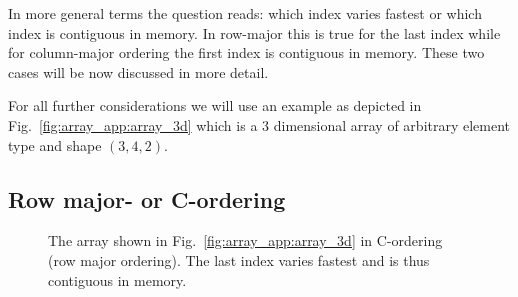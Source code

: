 In more general terms the question reads: which index varies fastest or which
index is contiguous in memory. In row-major this is true for the last index
while for column-major ordering the first index is contiguous in memory.
These two cases will be now discussed in more detail.

For all further considerations we will use an example as depicted in
Fig.~\ref{fig:array_app:array_3d} which is a 3 dimensional array of arbitrary
element type and shape $(3,4,2)$.

\subsection{Row major- or C-ordering}\label{sec:c_ordering}

\begin{figure}[tb]
\centering
\begin{minipage}{0.45\linewidth}
\centering
{}
\end{minipage}
\hfill
\begin{minipage}{0.4\linewidth}
\caption{{\small\label{fig:array_app:array_3d_corder}
The array shown in Fig.~\ref{fig:array_app:array_3d} in C-ordering (row major
ordering). The last index varies fastest and is thus contiguous in memory. 
}}
\end{minipage}
\end{figure}
